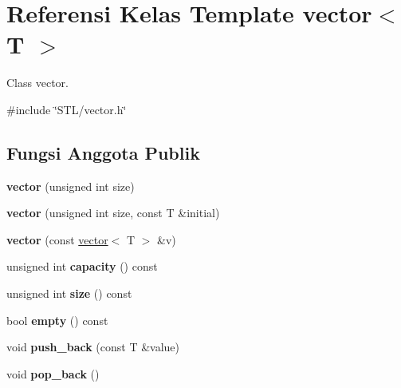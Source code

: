 \hypertarget{classvector}{}\section{Referensi Kelas Template vector$<$ T $>$}
\label{classvector}


Class vector.  




{\ttfamily \#include \char`\"{}S\+T\+L/vector.\+h\char`\"{}}

\subsection*{Fungsi Anggota Publik}
\begin{DoxyCompactItemize}
\item 
\hypertarget{classvector_ae0d26803a00988f33ca95a5a53d11c54}{}{\bfseries vector} (unsigned int size)\label{classvector_ae0d26803a00988f33ca95a5a53d11c54}

\item 
\hypertarget{classvector_a397ada02bf67d465821ba54d07e47e0c}{}{\bfseries vector} (unsigned int size, const T \&initial)\label{classvector_a397ada02bf67d465821ba54d07e47e0c}

\item 
\hypertarget{classvector_ae95f31bd9366f4af589095346962679f}{}{\bfseries vector} (const \hyperlink{classvector}{vector}$<$ T $>$ \&v)\label{classvector_ae95f31bd9366f4af589095346962679f}

\item 
\hypertarget{classvector_ac68f7da6ca40206d8fbfdd80c3b12b62}{}unsigned int {\bfseries capacity} () const \label{classvector_ac68f7da6ca40206d8fbfdd80c3b12b62}

\item 
\hypertarget{classvector_abd541636a83700f5708ee109fca6796a}{}unsigned int {\bfseries size} () const \label{classvector_abd541636a83700f5708ee109fca6796a}

\item 
\hypertarget{classvector_a6c885f006c9b70e0533e7194f5ae70a0}{}bool {\bfseries empty} () const \label{classvector_a6c885f006c9b70e0533e7194f5ae70a0}

\item 
\hypertarget{classvector_ad76deb64969b591fe8accbd2f69ea271}{}void {\bfseries push\+\_\+back} (const T \&value)\label{classvector_ad76deb64969b591fe8accbd2f69ea271}

\item 
\hypertarget{classvector_aeec9e5d602d555d466a936310aa47866}{}void {\bfseries pop\+\_\+back} ()\label{classvector_aeec9e5d602d555d466a936310aa47866}


\end{DoxyCompactItemize}

